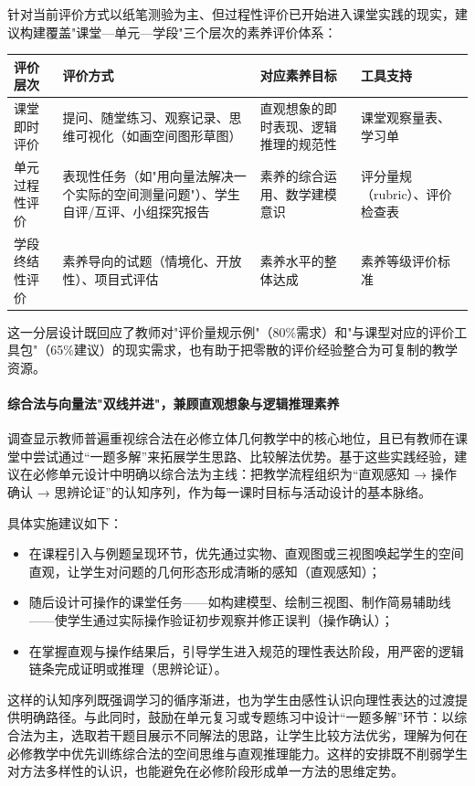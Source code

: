 \documentclass[UTF8,a4paper,12pt,twoside]{ctexart}
\begin{document}
针对当前评价方式以纸笔测验为主、但过程性评价已开始进入课堂实践的现实，建议构建覆盖"课堂—单元—学段"三个层次的素养评价体系：

\begin{center}
\begin{tabular}{|p{}|p{}|p{}|p{}|}
\hline
评价层次 & 评价方式 & 对应素养目标 & 工具支持 \\
\hline
课堂即时评价 & 提问、随堂练习、观察记录、思维可视化（如画空间图形草图） & 直观想象的即时表现、逻辑推理的规范性 & 课堂观察量表、学习单 \\
\hline
单元过程性评价 & 表现性任务（如"用向量法解决一个实际的空间测量问题"）、学生自评/互评、小组探究报告 & 素养的综合运用、数学建模意识 & 评分量规（rubric）、评价检查表 \\
\hline
学段终结性评价 & 素养导向的试题（情境化、开放性）、项目式评估 & 素养水平的整体达成 & 素养等级评价标准 \\
\hline
\end{tabular}
\end{center}

这一分层设计既回应了教师对"评价量规示例"（80\%需求）和"与课型对应的评价工具包"（65\%建议）的现实需求，也有助于把零散的评价经验整合为可复制的教学资源。

\paragraph{综合法与向量法"双线并进"，兼顾直观想象与逻辑推理素养}
调查显示教师普遍重视综合法在必修立体几何教学中的核心地位，且已有教师在课堂中尝试通过“一题多解”来拓展学生思路、比较解法优势。基于这些实践经验，建议在必修单元设计中明确以综合法为主线：把教学流程组织为“直观感知 → 操作确认 → 思辨论证”的认知序列，作为每一课时目标与活动设计的基本脉络。

具体实施建议如下：

\begin{itemize}
\item 在课程引入与例题呈现环节，优先通过实物、直观图或三视图唤起学生的空间直观，让学生对问题的几何形态形成清晰的感知（直观感知）；
\item 随后设计可操作的课堂任务——如构建模型、绘制三视图、制作简易辅助线——使学生通过实际操作验证初步观察并修正误判（操作确认）；
\item 在掌握直观与操作结果后，引导学生进入规范的理性表达阶段，用严密的逻辑链条完成证明或推理（思辨论证）。
\end{itemize}

这样的认知序列既强调学习的循序渐进，也为学生由感性认识向理性表达的过渡提供明确路径。与此同时，鼓励在单元复习或专题练习中设计“一题多解”环节：以综合法为主，选取若干题目展示不同解法的思路，让学生比较方法优劣，理解为何在必修教学中优先训练综合法的空间思维与直观推理能力。这样的安排既不削弱学生对方法多样性的认识，也能避免在必修阶段形成单一方法的思维定势。
\end{document}
